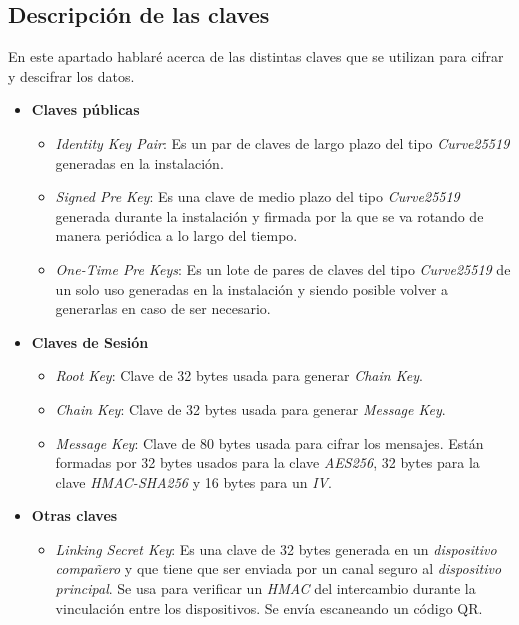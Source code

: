 \subsection{Descripción de las claves}
En este apartado hablaré acerca de las distintas claves que se utilizan para cifrar y descifrar los datos.\\
\begin{itemize}
	\item \textbf{Claves públicas}
		\begin{itemize}
			\item \emph{Identity Key Pair}: Es un par de claves de largo plazo del tipo \emph{Curve25519} generadas en la instalación.
			\item \emph{Signed Pre Key}: Es una clave de medio plazo del tipo \emph{Curve25519} generada durante la instalación y firmada por la  que se va rotando de manera periódica a lo largo del tiempo.
			\item \emph{One-Time Pre Keys}: Es un lote de pares de claves del tipo \emph{Curve25519} de un solo uso generadas en la instalación y siendo posible volver a generarlas en caso de ser necesario.
		\end{itemize}
	\item \textbf{Claves de Sesión}
		\begin{itemize}
			\item \emph{Root Key}: Clave de 32 bytes usada para generar \emph{Chain Key}.
			\item \emph{Chain Key}: Clave de 32 bytes usada para generar \emph{Message Key}.
			\item \emph{Message Key}: Clave de 80 bytes usada para cifrar los mensajes. Están formadas por 32 bytes usados para la clave \emph{AES256}, 32 bytes para la clave \emph{HMAC-SHA256} y 16 bytes para un \emph{IV}.
		\end{itemize}
	\item \textbf{Otras claves}
		\begin{itemize}
			\item \emph{Linking Secret Key}: Es una clave de 32 bytes generada en un \emph{dispositivo compañero} y que tiene que ser enviada por un canal seguro al \emph{dispositivo principal}. Se usa para verificar un \emph{HMAC} del intercambio durante la vinculación entre los dispositivos. Se envía escaneando un código QR.
		\end{itemize}
\end{itemize}

